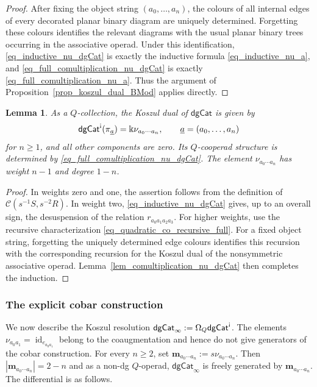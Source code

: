 \documentclass[11pt,letterpaper]{article}
\numberwithin{equation}{section}
\theoremstyle{plain}
\newtheorem{lem}[thm]{Lemma}
\theoremstyle{definition}
\theoremstyle{remark}
\newcommand{\antishriek}{%
	\mathord{\mathchoice
		{\rotatebox[origin=c]{180}{$\displaystyle !$}}
		{\rotatebox[origin=c]{180}{$\textstyle !$}}
		{\rotatebox[origin=c]{180}{$\scriptstyle !$}}
		{\rotatebox[origin=c]{180}{$\scriptscriptstyle !$}}}}
\newcommand{\id}{\operatorname{id}}
\begin{document}
	\begin{proof}
		After fixing the object string $(a_0,\ldots,a_n)$, the colours of all
		internal edges of every decorated planar binary diagram are uniquely
		determined. Forgetting these colours identifies the relevant diagrams
		with the usual planar binary trees occurring in the associative
		operad. Under this identification,
		\eqref{eq_inductive_nu_dgCat} is exactly the inductive formula
		\eqref{eq_inductive_nu_a}, and
		\eqref{eq_full_comultiplication_nu_dgCat} is exactly
		\eqref{eq_full_comultiplication_nu_a}. Thus the argument of
		Proposition~\ref{prop_koszul_dual_BMod} applies directly.
	\end{proof}

	\begin{lem}
		\label{lem_koszul_dual_dgCat}
		As a $Q$-collection, the Koszul dual of $\mathsf{dgCat}$ is given by
		\begin{equation*}
			\mathsf{dgCat}^{\antishriek}(\pi_{\underline a})
			=
			\Bbbk\nu_{a_0\cdots a_n},
			\qquad \underline a =(a_0,\dots, a_n)
		\end{equation*}
		for $n\geq1$, and all other components are zero. Its $Q$-cooperad structure is
		determined by
		\eqref{eq_full_comultiplication_nu_dgCat}. The element
		$\nu_{a_0\cdots a_n}$ has weight $n-1$ and degree $1-n$.
	\end{lem}

	\begin{proof}
		In weights zero and one, the assertion follows from the definition of
		$\mathscr C(s^{-1}S,s^{-2}R)$. In weight two,
		\eqref{eq_inductive_nu_dgCat} gives, up to an overall sign, the
		desuspension of the relation $r_{a_0a_1a_2a_3}$.
		For higher weights, use the recursive characterization
		\eqref{eq_quadratic_co_recursive_full}. For a fixed object string,
		forgetting the uniquely determined edge colours identifies this
		recursion with the corresponding recursion for the Koszul dual of the
		nonsymmetric associative operad. Lemma~\ref{lem_comultiplication_nu_dgCat}
		then completes the induction.
	\end{proof}

	\subsubsection{The explicit cobar construction}

	We now describe the Koszul resolution
	$\mathsf{dgCat}_\infty:=\Omega_Q\mathsf{dgCat}^{\antishriek}$.
	The elements $\nu_{a_0a_1}=\id_{e_{a_0a_1}}$ belong to the
	coaugmentation and hence do not give generators of the cobar
	construction. For every $n\geq2$, set
	$\mathbf m_{a_0\cdots a_n}:=s\nu_{a_0\cdots a_n}$.
	Then $|\mathbf m_{a_0\cdots a_n}|=2-n$
	and as a non-dg $Q$-operad,
	$\mathsf{dgCat}_\infty$ is freely generated by
	$\mathbf m_{a_0\cdots a_n}$.
	The differential is as follows.
\end{document}
